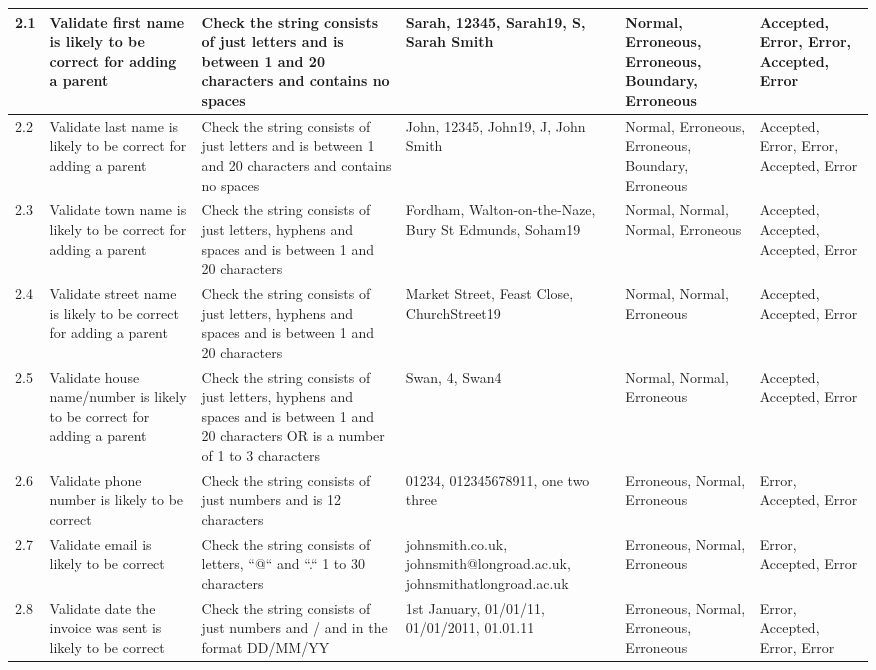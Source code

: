 \begin{landscape}
\begin{center}
\begin{longtable}{|p{1.5cm}|p{2.5cm}|p{2.5cm}|p{2cm}|p{2cm}|p{2cm}|}
        2.1 & Validate first name is likely to be correct for adding a parent & Check the string consists of just letters and is between 1 and 20 characters and contains no spaces & Sarah, 12345, Sarah19, S, Sarah Smith & Normal, Erroneous, Erroneous, Boundary, Erroneous & Accepted, Error, Error, Accepted, Error \\ \hline
        2.2 & Validate last name is likely to be correct for adding a parent & Check the string consists of just letters and is between 1 and 20 characters and contains no spaces & John, 12345, John19, J, John Smith & Normal, Erroneous, Erroneous, Boundary, Erroneous & Accepted, Error, Error, Accepted, Error \\ \hline
        2.3 & Validate town name is likely to be correct for adding a parent & Check the string consists of just letters, hyphens and spaces and is between 1 and 20 characters & Fordham, Walton-on-the-Naze, Bury St Edmunds, Soham19 & Normal, Normal, Normal, Erroneous & Accepted, Accepted, Accepted, Error \\ \hline
        2.4 & Validate street name is likely to be correct for adding a parent & Check the string consists of just letters, hyphens and spaces and is between 1 and 20 characters & Market Street, Feast Close, ChurchStreet19 & Normal, Normal, Erroneous & Accepted, Accepted, Error \\ \hline
        2.5 & Validate house name/number is likely to be correct for adding a parent & Check the string consists of just letters, hyphens and spaces and is between 1 and 20 characters OR is a number of 1 to 3 characters & Swan, 4, Swan4 & Normal, Normal, Erroneous & Accepted, Accepted, Error \\ \hline
        2.6 & Validate phone number is likely to be correct & Check the string consists of just numbers and is 12 characters & 01234, 012345678911, one two three & Erroneous, Normal, Erroneous & Error, Accepted, Error \\ \hline
        2.7 & Validate email is likely to be correct & Check the string consists of letters, ``@`` and ``.`` 1 to  30 characters & johnsmith.co.uk, johnsmith@longroad.ac.uk, johnsmithatlongroad.ac.uk & Erroneous, Normal, Erroneous & Error, Accepted, Error \\ \hline
        
        \rowcolor{darkgrey} 2.8 & Validate date the invoice was sent is likely to be correct & Check the string consists of just numbers and / and in the format DD/MM/YY & 1st January, 01/01/11, 01/01/2011, 01.01.11 & Erroneous, Normal, Erroneous, Erroneous & Error, Accepted, Error, Error \\ \hline
        

\end{longtable}
\end{center}
\end{landscape}
